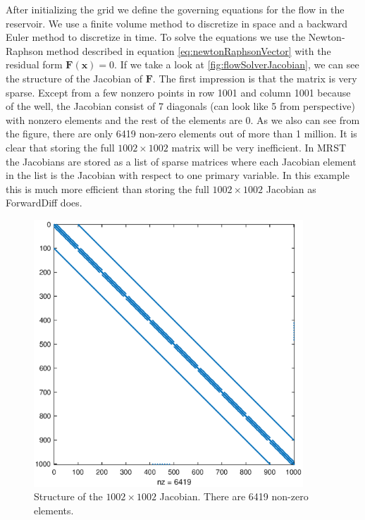 After initializing the grid we define the governing equations for the flow in the reservoir. We use a finite volume method to discretize in space and a backward Euler method to discretize in time. To solve the equations we use the Newton-Raphson method described in equation \eqref{eq:newtonRaphsonVector} with the residual form $\boldsymbol{F}(\boldsymbol{x}) = 0$. If we take a look at \autoref{fig:flowSolverJacobian}, we can see the structure of the Jacobian of $\boldsymbol{F}$. The first impression is that the matrix is very sparse. Except from a few nonzero points in row 1001 and column 1001 because of the well, the Jacobian consist of 7 diagonals (can look like 5 from perspective) with nonzero elements and the rest of the elements are 0. As we also can see from the figure, there are only 6419 non-zero elements out of more than 1 million. It is clear that storing the full $1002\times 1002$ matrix will be very inefficient. In MRST the Jacobians are stored as a list of sparse matrices where each Jacobian element in the list is the Jacobian with respect to one primary variable. In this example this is much more efficient than storing the full $1002\times 1002$ Jacobian as ForwardDiff does.

\begin{figure}[htbp]
    \centering
    \includegraphics[width = 0.9\textwidth]{figures/flowSolver_Jacobian.eps}
    \caption{Structure of the $1002\times 1002$ Jacobian. There are 6419 non-zero elements.}
    \label{fig:flowSolverJacobian}
\end{figure}